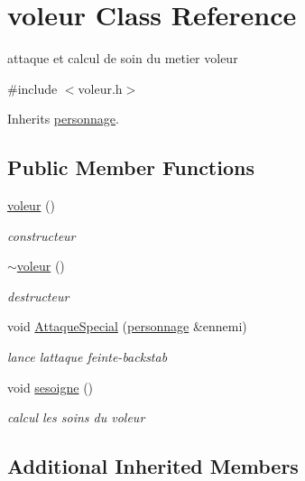 \hypertarget{classvoleur}{}\section{voleur Class Reference}
\label{classvoleur}


attaque et calcul de soin du metier voleur  




{\ttfamily \#include $<$voleur.\+h$>$}



Inherits \mbox{\hyperlink{classpersonnage}{personnage}}.

\subsection*{Public Member Functions}
\begin{DoxyCompactItemize}
\item 
\mbox{\hyperlink{classvoleur_aa41df8072eee3f5d930590677e0241ca}{voleur}} ()
\begin{DoxyCompactList}\small\item\em constructeur \end{DoxyCompactList}\item 
\mbox{\hyperlink{classvoleur_a4b5410d4e26256dc4d167520ee6f1b2e}{$\sim$voleur}} ()
\begin{DoxyCompactList}\small\item\em destructeur \end{DoxyCompactList}\item 
void \mbox{\hyperlink{classvoleur_a3c35701899c8774ce1ae9998983a37b4}{Attaque\+Special}} (\mbox{\hyperlink{classpersonnage}{personnage}} \&ennemi)
\begin{DoxyCompactList}\small\item\em lance l\textquotesingle{}attaque feinte-\/backstab \end{DoxyCompactList}\item 
void \mbox{\hyperlink{classvoleur_a3efa7817c3c2a8c5c025df9e9974c218}{sesoigne}} ()
\begin{DoxyCompactList}\small\item\em calcul les soins du voleur \end{DoxyCompactList}\end{DoxyCompactItemize}
\subsection*{Additional Inherited Members}


